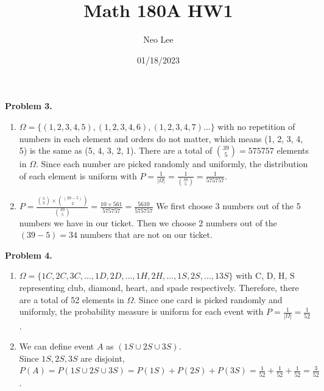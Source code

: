 \documentclass{article}
\title{Math 180A HW1}
\author{Neo Lee}
\date{01/18/2023}
\begin{document}
 

\maketitle 

\textbf{Problem 3.}
\begin{enumerate}[label={(\alph*)}]
    \item 
    $\Omega = \{(1, 2, 3, 4, 5), (1, 2, 3, 4, 6), (1, 2, 3, 4, 7)\dots\}$ with no repetition of numbers in each element and orders do not matter, which means (1, 2, 3, 4, 5) is the same as (5, 4, 3, 2, 1). 
    There are a total of ${39 \choose 5} = 575757$ elements in $\Omega$. 
    \smallbreak
    Since each number are picked randomly and uniformly, the distribution of each element is uniform with $P = \frac{1}{|\Omega|} = \frac{1}{{39 \choose 5}} = \frac{1}{575757}$.

    \item
    $P = \frac{{5 \choose 3} \times {(39 - 5) \choose 2}}{{39 \choose 5}} = \frac{10 \times 561}{575757} = \frac{5610}{575757}$ 
    \smallbreak
    We first choose 3 numbers out of the 5 numbers we have in our ticket. Then we choose 2 numbers out of the $(39 - 5) = 34$ numbers that are not on our ticket.
\end{enumerate}
\bigbreak

\textbf{Problem 4.}
\begin{enumerate}[label={(\alph*)}]
    \item 
    $\Omega = \{1C, 2C, 3C, \dots ,1D, 2D, \dots, 1H, 2H, \dots, 1S, 2S, \dots, 13S \}$ with C, D, H, S representing club, diamond, heart, and spade respectively.
    Therefore, there are a total of 52 elements in $\Omega$. 
    \smallbreak
    Since one card is picked randomly and uniformly, the probability measure is uniform for each event with $P = \frac{1}{|\Omega|} = \frac{1}{52}$.

    \item 
    We can define event $A$ as $(1S \cup 2S \cup 3S)$. \\
    Since $1S, 2S, 3S$ are disjoint, $P(A) = P(1S \cup 2S \cup 3S) = P(1S) + P(2S) + P(3S) = \frac{1}{52} + \frac{1}{52} + \frac{1}{52} = \frac{3}{52}$.
\end{enumerate}
\pagebreak
    
\end{document}
